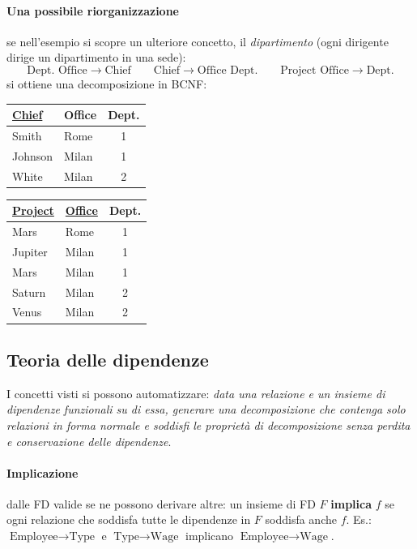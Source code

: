 \documentclass[a4paper,12pt]{article}
\begin{document}
\paragraph{Una possibile riorganizzazione} se nell'esempio si scopre un
ulteriore concetto, il \emph{dipartimento} (ogni dirigente dirige un
dipartimento in una sede):
\[
\text{Dept. Office} \to \text{Chief} \qquad
\text{Chief} \to \text{Office Dept.} \qquad
\text{Project Office} \to \text{Dept.}
\]
si ottiene una decomposizione in BCNF:
\begin{center}
\begin{tabular}{|l|l|c|}
\hline
\underline{Chief} & Office & Dept.\\ \hline
Smith & Rome & 1\\ Johnson & Milan & 1\\ White & Milan & 2\\ \hline
\end{tabular}
\qquad
\begin{tabular}{|l|l|c|}
\hline
\underline{Project} & \underline{Office} & Dept.\\ \hline
Mars & Rome & 1\\ Jupiter & Milan & 1\\ Mars & Milan & 1\\
Saturn & Milan & 2\\ Venus & Milan & 2\\ \hline
\end{tabular}
\end{center}

\subsection{Teoria delle dipendenze}

I concetti visti si possono automatizzare: \emph{data una relazione e un
insieme di dipendenze funzionali su di essa, generare una decomposizione che
contenga solo relazioni in forma normale e soddisfi le proprietà di
decomposizione senza perdita e conservazione delle dipendenze}.

\paragraph{Implicazione} dalle FD valide se ne possono derivare altre: un
insieme di FD $F$ \textbf{implica} $f$ se ogni relazione che soddisfa tutte le
dipendenze in $F$ soddisfa anche $f$. Es.: $\text{Employee} \to \text{Type}$ e
$\text{Type} \to \text{Wage}$ implicano $\text{Employee} \to \text{Wage}$.
\end{document}
